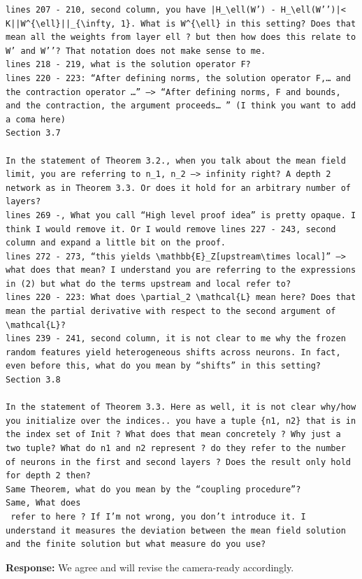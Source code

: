 \documentclass[11pt,a4paper]{article}
\begin{document}
\begin{verbatim}
lines 207 - 210, second column, you have |H_\ell(W’) - H_\ell(W’’)|< K||W^{\ell}||_{\infty, 1}. What is W^{\ell} in this setting? Does that mean all the weights from layer ell ? but then how does this relate to W’ and W’’? That notation does not make sense to me.
lines 218 - 219, what is the solution operator F?
lines 220 - 223: “After defining norms, the solution operator F,… and the contraction operator …” —> “After defining norms, F and bounds, and the contraction, the argument proceeds… ” (I think you want to add a coma here)
Section 3.7

In the statement of Theorem 3.2., when you talk about the mean field limit, you are referring to n_1, n_2 —> infinity right? A depth 2 network as in Theorem 3.3. Or does it hold for an arbitrary number of layers?
lines 269 -, What you call “High level proof idea” is pretty opaque. I think I would remove it. Or I would remove lines 227 - 243, second column and expand a little bit on the proof.
lines 272 - 273, “this yields \mathbb{E}_Z[upstream\times local]” —> what does that mean? I understand you are referring to the expressions in (2) but what do the terms upstream and local refer to?
lines 220 - 223: What does \partial_2 \mathcal{L} mean here? Does that mean the partial derivative with respect to the second argument of \mathcal{L}?
lines 239 - 241, second column, it is not clear to me why the frozen random features yield heterogeneous shifts across neurons. In fact, even before this, what do you mean by “shifts” in this setting?
Section 3.8

In the statement of Theorem 3.3. Here as well, it is not clear why/how you initialize over the indices.. you have a tuple {n1, n2} that is in the index set of Init ? What does that mean concretely ? Why just a two tuple? What do n1 and n2 represent ? do they refer to the number of neurons in the first and second layers ? Does the result only hold for depth 2 then?
Same Theorem, what do you mean by the “coupling procedure”?
Same, What does 
 refer to here ? If I’m not wrong, you don’t introduce it. I understand it measures the deviation between the mean field solution and the finite solution but what measure do you use?
\end{verbatim}
\textbf{Response:} We agree and will revise the camera-ready accordingly.
\end{document}
